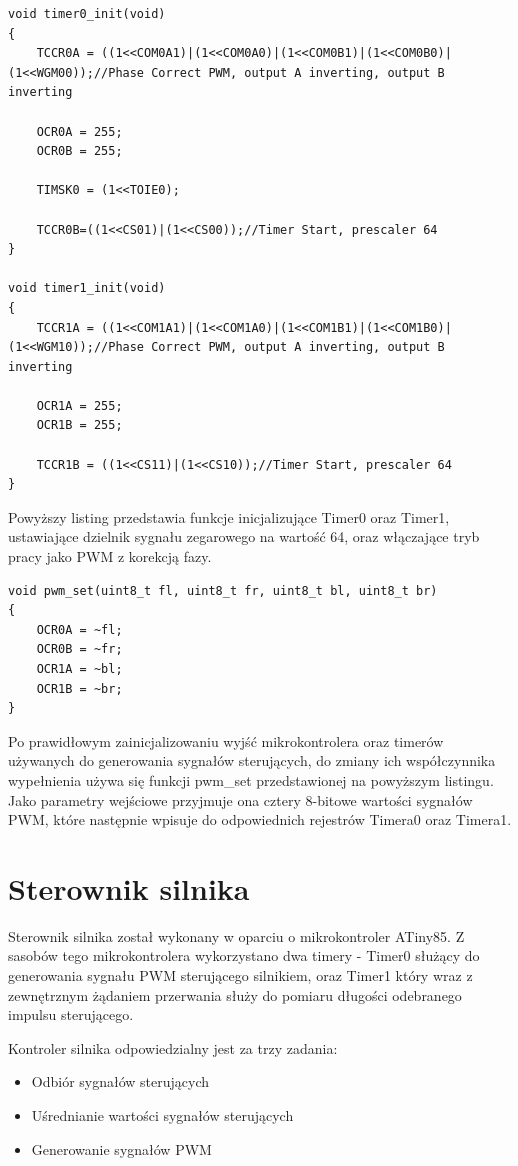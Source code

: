 \begin{lstlisting}
void timer0_init(void)
{
	TCCR0A = ((1<<COM0A1)|(1<<COM0A0)|(1<<COM0B1)|(1<<COM0B0)|(1<<WGM00));//Phase Correct PWM, output A inverting, output B inverting

	OCR0A = 255;
	OCR0B = 255;

	TIMSK0 = (1<<TOIE0);

	TCCR0B=((1<<CS01)|(1<<CS00));//Timer Start, prescaler 64
}

void timer1_init(void)
{
	TCCR1A = ((1<<COM1A1)|(1<<COM1A0)|(1<<COM1B1)|(1<<COM1B0)|(1<<WGM10));//Phase Correct PWM, output A inverting, output B inverting

	OCR1A = 255;
	OCR1B = 255;

	TCCR1B = ((1<<CS11)|(1<<CS10));//Timer Start, prescaler 64
}
\end{lstlisting}

Powyższy listing przedstawia funkcje inicjalizujące Timer0 oraz Timer1, ustawiające dzielnik sygnału zegarowego na wartość 64, oraz włączające tryb pracy jako PWM z korekcją fazy.

\begin{lstlisting}
void pwm_set(uint8_t fl, uint8_t fr, uint8_t bl, uint8_t br)
{
	OCR0A = ~fl;
	OCR0B = ~fr;
	OCR1A = ~bl;
	OCR1B = ~br;
}
\end{lstlisting}

Po prawidłowym zainicjalizowaniu wyjść mikrokontrolera oraz timerów używanych do generowania sygnałów sterujących, do zmiany ich współczynnika wypełnienia używa się funkcji pwm\_set przedstawionej na powyższym listingu. Jako parametry wejściowe przyjmuje ona cztery 8-bitowe wartości sygnałów PWM, które następnie wpisuje do odpowiednich rejestrów Timera0 oraz Timera1.

\section{Sterownik silnika}

Sterownik silnika został wykonany w oparciu o mikrokontroler ATiny85. Z sasobów tego mikrokontrolera wykorzystano dwa timery - Timer0 służący do generowania sygnału PWM sterującego silnikiem, oraz Timer1 który wraz z zewnętrznym żądaniem przerwania służy do pomiaru długości odebranego impulsu sterującego.

Kontroler silnika odpowiedzialny jest za trzy zadania:
\begin{itemize}
	\item Odbiór sygnałów sterujących
	\item Uśrednianie wartości sygnałów sterujących
	\item Generowanie sygnałów PWM
\end{itemize}

